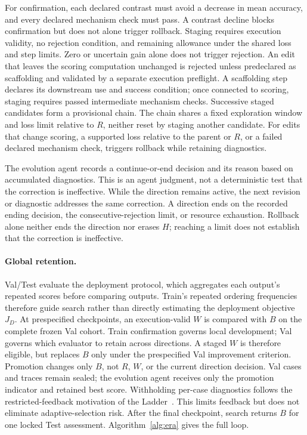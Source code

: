 For confirmation, each declared contrast must avoid a decrease in mean accuracy, and every declared mechanism check must pass.
A contrast decline blocks confirmation but does not alone trigger rollback.
Staging requires execution validity, no rejection condition, and remaining allowance under the shared loss and step limits.
Zero or uncertain gain alone does not trigger rejection.
An edit that leaves the scoring computation unchanged is rejected unless predeclared as scaffolding and validated by a separate execution preflight.
A scaffolding step declares its downstream use and success condition; once connected to scoring, staging requires passed intermediate mechanism checks.
Successive staged candidates form a provisional chain.
The chain shares a fixed exploration window and loss limit relative to $R$, neither reset by staging another candidate.
For edits that change scoring, a supported loss relative to the parent or $R$, or a failed declared mechanism check, triggers rollback while retaining diagnostics.

The evolution agent records a continue-or-end decision and its reason based on accumulated diagnostics.
This is an agent judgment, not a deterministic test that the correction is ineffective.
While the direction remains active, the next revision or diagnostic addresses the same correction.
A direction ends on the recorded ending decision, the consecutive-rejection limit, or resource exhaustion.
Rollback alone neither ends the direction nor erases $H$; reaching a limit does not establish that the correction is ineffective.

\paragraph{Global retention.}
Val/Test evaluate the deployment protocol, which aggregates each output's repeated scores before comparing outputs.
Train's repeated ordering frequencies therefore guide search rather than directly estimating the deployment objective $J_D$.
At prespecified checkpoints, an execution-valid $W$ is compared with $B$ on the complete frozen Val cohort.
Train confirmation governs local development; Val governs which evaluator to retain across directions.
A staged $W$ is therefore eligible, but replaces $B$ only under the prespecified Val improvement criterion.
Promotion changes only $B$, not $R$, $W$, or the current direction decision.
Val cases and traces remain sealed; the evolution agent receives only the promotion indicator and retained best score.
Withholding per-case diagnostics follows the restricted-feedback motivation of the Ladder~\citep{blum2015ladder}.
This limits feedback but does not eliminate adaptive-selection risk.
After the final checkpoint, search returns $B$ for one locked Test assessment.
Algorithm~\ref{alg:era} gives the full loop.
